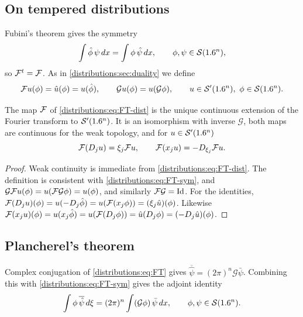 \subsection{On tempered distributions}
Fubini's theorem gives the symmetry
\begin{equation}\label{distributions:eq:FT-sym}
  \int\hat\phi\,\psi\,dx=\int\phi\,\hat\psi\,dx,\qquad\phi,\psi\in\mathcal{S}(1.6^n),
\end{equation}
so $\mathcal{F}^t=\mathcal{F}$. As in \cref{distributions:sec:duality} we define
\begin{equation}\label{distributions:eq:FT-dist}
  \cF u(\phi)=\hat u(\phi)=u(\hat\phi),\qquad
  \mathcal{G}u(\phi)=u(\mathcal{G}\phi),\qquad u\in\cSp(\R^n),\ \phi\in\cS(\R^n).
\end{equation}

\begin{corollary}\label{distributions:cor:FT-dist}
The map $\mathcal{F}$ of \eqref{distributions:eq:FT-dist} is the unique continuous extension of
the Fourier transform to $\mathcal{S}'(1.6^n)$. It is an isomorphism with inverse $\mathcal{G}$,
both maps are continuous for the weak topology, and
for $u\in\mathcal{S}'(1.6^n)$
\[
  \mathcal{F}(D_ju)=\xi_j\mathcal{F} u,\qquad\mathcal{F}(x_ju)=-D_{\xi_j}\mathcal{F} u.
\]
\end{corollary}
\begin{proof}
Weak continuity is immediate from \eqref{distributions:eq:FT-dist}. The definition is
consistent with \eqref{distributions:eq:FT-sym}, and
$\mathcal{G}\mathcal{F} u(\phi)=u(\mathcal{F}\mathcal{G}\phi)=u(\phi)$, and similarly
$\mathcal{F}\mathcal{G}=\operatorname{Id}$. For the identities,
$\mathcal{F}(D_ju)(\phi)=u(-D_j\hat\phi)=u(\mathcal{F}(x_j\phi))=(\xi_j\hat u)(\phi)$. Likewise
$\mathcal{F}(x_ju)(\phi)=u(x_j\hat\phi)=u(\mathcal{F}(D_j\phi))=\hat u(D_j\phi)=(-D_j\hat u)(\phi)$.
\end{proof}

\subsection{Plancherel's theorem}
Complex conjugation of \eqref{distributions:eq:FT} gives
$\overline{\hat\psi}=(2\pi)^n\mathcal{G}\bar\psi$. Combining this with
\eqref{distributions:eq:FT-sym} gives the adjoint identity
\begin{equation}\label{distributions:eq:adjoint}
  \int\phi\,\overline{\hat\psi}\,d\xi=(2\pi)^n\int(\mathcal{G}\phi)\,\bar\psi\,dx,
  \qquad\phi,\psi\in\mathcal{S}(1.6^n).
\end{equation}

